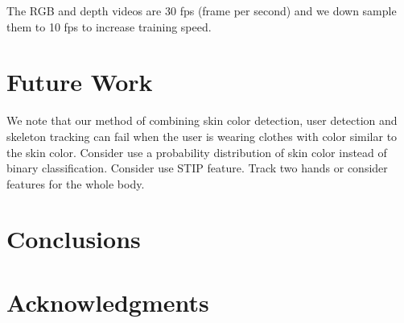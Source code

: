 \documentclass{sig-alternate}
\begin{document}
The RGB and depth videos are 30 fps (frame per second) and we down sample them
to 10 fps to increase training speed.

\section{Future Work}
We note that our method of combining skin color detection, user detection and
skeleton tracking can fail when the user is wearing clothes with color similar
to the skin color. Consider use a probability distribution of skin color instead
of binary classification. Consider use STIP feature. Track two hands or consider
features for the whole body. 

\section{Conclusions}


\section{Acknowledgments}

%

%

\end{document}
